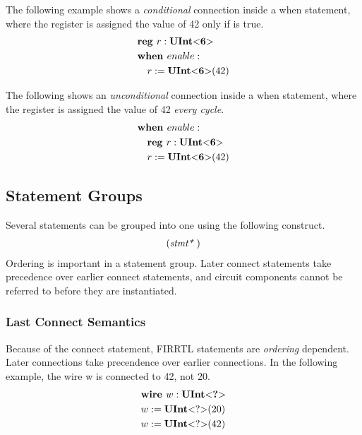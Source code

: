 \documentclass[12pt]{article}
\begin{document}
The following example shows a {\em conditional} connection inside a when statement, where the register  is assigned the value of 42 only if  is true.
\[
\begin{aligned}
&\text{\bf reg\ } r : \text{\bf UInt}\text{\bf $<$} \text{\bf 6} \text{\bf $>$} \\
&\text{\bf when\ } enable : \\
&\quad r := \text{\bf UInt}\text{\bf $<$} \text{\bf 6} \text{\bf $>$}(42) \\
\end{aligned}
\]

The following shows an {\em unconditional} connection inside a when statement, where the register  is assigned the value of 42 {\em every cycle}.
\[
\begin{aligned}
&\text{\bf when\ } enable : \\
&\quad \text{\bf reg\ } r : \text{\bf UInt}\text{\bf $<$} \text{\bf 6} \text{\bf $>$} \\
&\quad r := \text{\bf UInt}\text{\bf $<$} \text{\bf 6} \text{\bf $>$}(42) \\
\end{aligned}
\]

\subsection{Statement Groups}
Several statements can be grouped into one using the following construct.
\[
\begin{aligned}
(\text{\em stmt*\ })
\end{aligned}
\]
Ordering is important in a statement group.
Later connect statements take precedence over earlier connect statements, and circuit components cannot be referred to before they are instantiated.

\subsubsection{Last Connect Semantics}
Because of the connect statement, FIRRTL statements are {\em ordering} dependent.
Later connections take precendence over earlier connections.
In the following example, the wire w is connected to 42, not 20. 
\[
\begin{aligned}
&\text{\bf wire\ } w : \text{\bf UInt}\text{\bf $<$} \text{\bf ?} \text{\bf $>$} \\
&w := \text{\bf UInt}\text{\bf $<$} ? \text{\bf $>$}(20) \\
&w := \text{\bf UInt}\text{\bf $<$} ? \text{\bf $>$}(42) \\
\end{aligned}
\]
\end{document}
